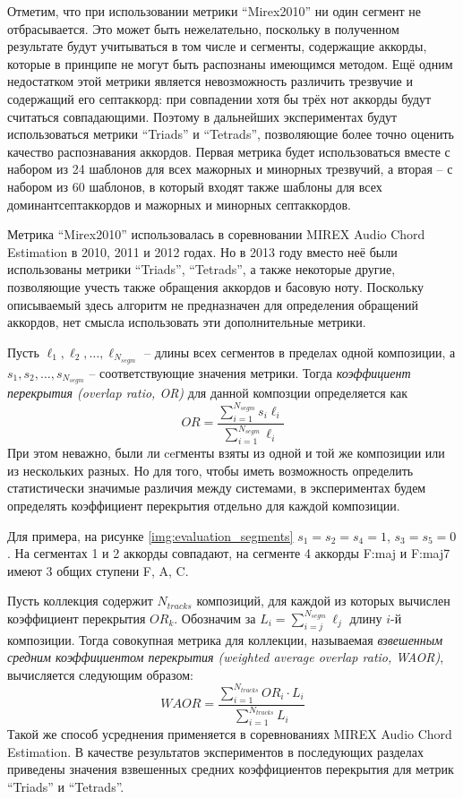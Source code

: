 Отметим, что при использовании метрики ``Mirex2010'' ни один сегмент не
отбрасывается. Это может быть нежелательно, поскольку в полученном результате
будут учитываться в том числе и сегменты, содержащие аккорды, которые в принципе
не могут быть распознаны имеющимся методом. Ещё одним недостатком этой метрики
является невозможность различить трезвучие и содержащий его септаккорд: при
совпадении хотя бы трёх нот аккорды будут считаться совпадающими. Поэтому в
дальнейших экспериментах будут использоваться метрики ``Triads'' и ``Tetrads'',
позволяющие более точно оценить качество распознавания аккордов. Первая метрика
будет использоваться вместе с набором из 24 шаблонов для всех мажорных и
минорных трезвучий, а вторая -- с набором из 60 шаблонов, в который входят также
шаблоны для всех доминантсептаккордов и мажорных и минорных септаккордов.

Метрика ``Mirex2010'' использовалась в соревновании MIREX Audio Chord Estimation
в 2010, 2011 и 2012 годах. Но в 2013 году вместо неё были использованы метрики
``Triads'', ``Tetrads'', а также некоторые другие, позволяющие учесть также
обращения аккордов и басовую ноту. Поскольку описываемый здесь алгоритм не
предназначен для определения обращений аккордов, нет смысла использовать эти
дополнительные метрики.

Пусть $\ell_1, \ell_2, \ldots, \ell_{N_{segm}}$ -- длины всех сегментов в
пределах одной композиции, а $s_1, s_2, \ldots, s_{N_{segm}}$ -- соответствующие
значения метрики. Тогда \emph{коэффициент перекрытия (overlap ratio, OR)} для
данной композции определяется как
\begin{equation} \label{eq:or}
OR = \frac{\sum_{i=1}^{N_{segm}} s_i \ell_i}{\sum_{i=1}^{N_{segm}} \ell_i}
\end{equation}
При этом неважно, были ли ceгменты взяты из одной и той же композиции или из
нескольких разных. Но для того, чтобы иметь возможность определить
статистически значимые различия между системами, в экспериментах будем
определять коэффициент перекрытия отдельно для каждой композиции.

Для примера, на рисунке \ref{img:evaluation_segments} $s_1 = s_2 = s_4 = 1$,
$s_3 = s_5 = 0$. На сегментах 1 и 2 аккорды совпадают, на сегменте 4 аккорды
F:maj и F:maj7 имеют 3 общих ступени F, A, C.

Пусть коллекция содержит $N_{tracks}$ композиций, для каждой из которых
вычислен коэффициент перекрытия $OR_k$. Обозначим за $L_i =
\sum_{i=j}^{N_{segm}} \ell_j$ длину $i$-й композиции. Тогда совокупная метрика
для коллекции, называемая \emph{взвешенным средним коэффициентом перекрытия
(weighted average overlap ratio, WAOR)}, вычисляется следующим образом:
\begin{equation} \label{eq:waor}
WAOR = \frac{\sum_{i=1}^{N_{tracks}} OR_i \cdot L_i}{\sum_{i=1}^{N_{tracks}}
L_i}
\end{equation}
Такой же способ усреднения применяется в соревнованиях MIREX Audio Chord
Estimation. В качестве результатов экспериментов в последующих разделах
приведены значения взвешенных средних коэффициентов перекрытия для метрик
``Triads'' и ``Tetrads''.


